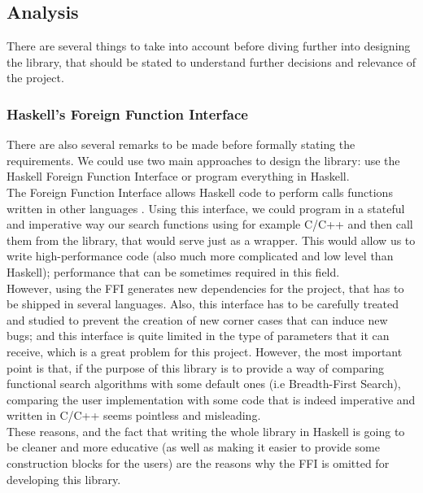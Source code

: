 \subsection{Analysis}

There are several things to take into account before diving further into
designing the library, that should be stated to understand further decisions
and relevance of the project.\\

\subsubsection{Haskell's Foreign Function Interface}

There are also several remarks to be made before formally stating the
requirements. We could use two main approaches to design the library: use the
Haskell Foreign Function Interface or program everything in Haskell.\\

The Foreign Function Interface allows Haskell code to perform calls functions
written in other languages \cite{haskell98-ffi}. Using this interface, we could
program in a stateful and imperative way our search functions using for example
C/C++ and then call them from the library, that would serve just as a wrapper.
This would allow us to write high-performance code (also much more complicated
and low level than Haskell); performance that can be sometimes required in
this field.\\

However, using the FFI generates new dependencies for the project, that has to
be shipped in several languages. Also, this interface has to be carefully
treated and studied to prevent the creation of new corner cases that can induce
new bugs; and this interface is quite limited in the type of parameters that it
can receive, which is a great problem for this project. However, the most
important point is that, if the purpose of this library is to provide a way of
comparing functional search algorithms with some default ones (i.e
Breadth-First Search), comparing the user implementation with some code that is
indeed imperative and written in C/C++ seems pointless and misleading.\\

These reasons, and the fact that writing the whole library in Haskell is going
to be cleaner and more educative (as well as making it easier to provide some
construction blocks for the users) are the reasons why the FFI is omitted for
developing this library.\\

